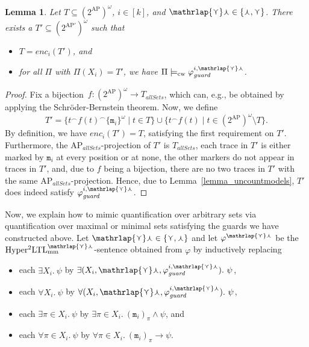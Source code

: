 \documentclass[dvipsnames,10pt,a4paper]{amsart}
\newtheorem{lem}[thm]{Lemma}
\theoremstyle{definition}
\theoremstyle{remark}
\renewcommand{\phi}{\varphi}
\newcommand{\pow}[1]{2^{#1}}
\newcommand{\set}[1]{\{#1\}}
\newcommand{\sohyltlfpsmalar}{\mathrm{Hyper^2LTL_{\mathrm{mm}}^{\smalar}}\xspace}
\newcommand{\ap}[0]{\mathrm{AP}}
\newcommand{\smallest}{\curlyvee}
\newcommand{\largest}{\curlywedge}
\newcommand{\smalar}{{\mathrlap{\curlyvee}\curlywedge}}
\newcommand{\allsets}{{\mathit{allSets}}}
\newcommand{\cw}{\mathrm{cw}}
\newcommand{\marker}{\texttt{m}}
\newcommand{\merge}{^\smallfrown}
\newcommand{\guard}{\mathit{guard}}
\newcommand{\enc}{\mathit{enc}}
\begin{document}
\begin{lem}
\label{lemma_encodingrichness}
Let $T \subseteq (\pow{\ap})^\omega$, $i \in [k]$, and $\smalar \in \set{\largest,\smallest}$.
There exists a $T' \subseteq (\pow{\ap'})^\omega$ such that
\begin{itemize}
    \item $T = \enc_i(T')$, and 
    \item for all $\Pi$ with $\Pi(X_i) = T'$, we have $\Pi \models_\cw \phi_\guard^{i,\smalar}$.
\end{itemize}
\end{lem}

\begin{proof}
Fix a bijection~$f \colon (\pow{\ap})^\omega \rightarrow T_\allsets$, which can, e.g., be obtained by applying the Schröder-Bernstein theorem.
Now, we define 
\[T' = \set{t\merge f(t) \merge\set{\marker_{i}}^\omega \mid t \in T} \cup \set{t\merge f(t) \mid t \in (\pow{\ap})^\omega \setminus T}. \]
By definition, we have $\enc_i(T') = T$, satisfying the first requirement on $T'$.
Furthermore, the $\ap_\allsets$-projection of $T'$ is $T_\allsets$, each trace in $T'$ is either marked by $\marker_{i}$ at every position or at none, the other markers do not appear in traces in $T'$, and, due to $f$ being a bijection, there are no two traces in $T'$ with the same $\ap_\allsets$-projection.
Hence, due to Lemma~\ref{lemma_uncountmodels}, $T'$ does indeed satisfy $\phi_\guard^{i,\smalar}$.
\end{proof}

Now, we explain how to mimic quantification over arbitrary sets via quantification over maximal or minimal sets satisfying the guards we have constructed above.
Let $\smalar \in \set{\smallest, \largest}$ and let $\varphi^{\smalar}$ be the $\sohyltlfpsmalar$-sentence obtained from $\phi$ by inductively replacing 
\begin{itemize}
    \item each $\exists X_i.\ \psi$ by $\exists (X_i, \smalar, \varphi_\guard^{i,\smalar}).\ \psi$, 
    \item each $\forall X_i.\ \psi$ by $\forall (X_i, \smalar, \varphi_\guard^{i,\smalar}).\ \psi$, 
    \item each $\exists \pi \in X_i.\ \psi$ by $\exists \pi \in X_i.\ (\marker_{i})_{\pi} \wedge \psi$, and 
    \item each $\forall \pi \in X_i.\ \psi$ by $\forall \pi \in X_i.\ (\marker_{i})_{\pi} \rightarrow \psi$.
\end{itemize}
\end{document}
